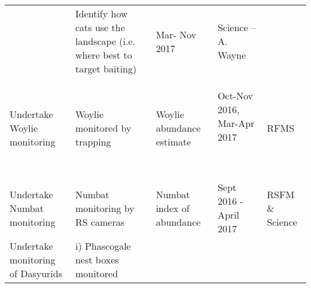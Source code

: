 \documentclass[version=last,
    paper=a4,                               %
    10pt,                                   %
    dvipsnames,
    oneside,                              %
    headings=openany,                       %
    open=any,
    BCOR=7mm,                               %
    DIV=15,     %
]{scrbook}
\begin{document}
\begin{longtable}[c]{@{}lllll@{}}
\begin{minipage}[t]{0.17\columnwidth}
~
\end{minipage} & \begin{minipage}[t]{0.17\columnwidth}\raggedright
Identify how cats use the landscape (i.e. where best to target baiting)
\end{minipage} & \begin{minipage}[t]{0.17\columnwidth}\raggedright
Mar- Nov 2017
\end{minipage} & \begin{minipage}[t]{0.17\columnwidth}\raggedright
Science -- A. Wayne
\end{minipage}
\\\addlinespace
\begin{minipage}[t]{0.17\columnwidth}\raggedright
Undertake Woylie monitoring
\end{minipage} & \begin{minipage}[t]{0.17\columnwidth}\raggedright
Woylie monitored by trapping
\end{minipage} & \begin{minipage}[t]{0.17\columnwidth}\raggedright
Woylie abundance estimate
\end{minipage} & \begin{minipage}[t]{0.17\columnwidth}\raggedright
Oct-Nov 2016, Mar-Apr 2017

~
\end{minipage} & \begin{minipage}[t]{0.17\columnwidth}\raggedright
RFMS
\end{minipage}
\\\addlinespace
\begin{minipage}[t]{0.17\columnwidth}\raggedright
Undertake Numbat monitoring
\end{minipage} & \begin{minipage}[t]{0.17\columnwidth}\raggedright
Numbat monitoring by RS cameras
\end{minipage} & \begin{minipage}[t]{0.17\columnwidth}\raggedright
Numbat index of abundance
\end{minipage} & \begin{minipage}[t]{0.17\columnwidth}\raggedright
Sept 2016 - April 2017
\end{minipage} & \begin{minipage}[t]{0.17\columnwidth}\raggedright
RSFM \& Science
\end{minipage}
\\\addlinespace
\begin{minipage}[t]{0.17\columnwidth}\raggedright
Undertake monitoring of Dasyurids
\end{minipage} & \begin{minipage}[t]{0.17\columnwidth}\raggedright
i) Phascogale nest boxes monitored


\end{minipage}
\end{longtable}
\end{document}

